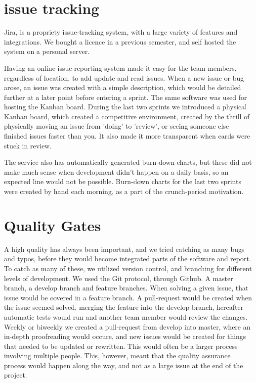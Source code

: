 \section{issue tracking}
Jira, is a propriety issue-tracking system, with a large variety of features and integrations.
We bought a licence in a previous semester, and self hosted the system on a personal server.


Having an online issue-reporting system made it easy for the team members, regardless of location, to add update and read issues. 
When a new issue or bug arose, an issue was created with a simple description, which would be detailed further at a later point before entering a sprint.
The same software was used for hosting the Kanban board.
During the last two sprints we introduced a physical Kanban board, which created a competitive environment, created by the thrill of physically moving an issue from 'doing' to 'review', or seeing someone else finished issues faster than you.
It also made it more transparent when cards were stuck in review.


The service also has automatically generated burn-down charts, but these did not make much sense when development didn't happen on a daily basis, so an expected line would not be possible.
Burn-down charts for the last two sprints were created by hand each morning, as a part of the crunch-period motivation.


\section{Quality Gates}
A high quality has always been important, and we tried catching as many bugs and typos, before they would become integrated parts of the software and report. 
To catch as many of these, we utilized version control, and branching for different levels of development.
We used the Git protocol, through Github.
A master branch, a develop branch and feature branches.
When solving a given issue, that issue would be covered in a feature branch. 
A pull-request would be created when the issue seemed solved, merging the feature into the develop branch, hereafter automatic tests would run and another team member would review the changes. 
Weekly or biweekly we created a pull-request from develop into master, where an in-depth proofreading would occure, and new issues would be created for things that needed to be updated or rewritten.
This would often be a larger process involving multiple people.
This, however, meant that the quality assurance process would happen along the way, and not as a large issue at the end of the project.



